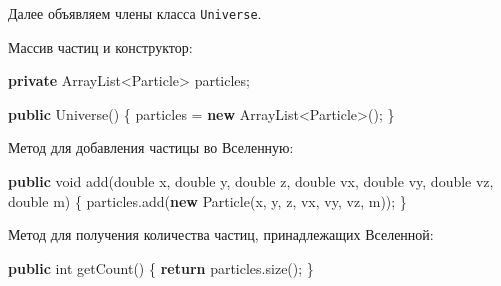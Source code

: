 \documentclass[
  12pt,
  a4paper,
]{article}
\newenvironment{Shaded}{}{}
\newcommand{\BuiltInTok}[1]{#1}
\newcommand{\ControlFlowTok}[1]{\textcolor[rgb]{0.00,0.44,0.13}{\textbf{#1}}}
\newcommand{\DataTypeTok}[1]{\textcolor[rgb]{0.56,0.13,0.00}{#1}}
\newcommand{\FunctionTok}[1]{\textcolor[rgb]{0.02,0.16,0.49}{#1}}
\newcommand{\KeywordTok}[1]{\textcolor[rgb]{0.00,0.44,0.13}{\textbf{#1}}}
\newcommand{\NormalTok}[1]{#1}
\newcommand{\OperatorTok}[1]{\textcolor[rgb]{0.40,0.40,0.40}{#1}}
\begin{document}
Далее объявляем члены класса \texttt{Universe}.

Массив частиц и конструктор:

\begin{Shaded}
\begin{Highlighting}[]
\KeywordTok{private} \BuiltInTok{ArrayList}\OperatorTok{\textless{}}\NormalTok{Particle}\OperatorTok{\textgreater{}}\NormalTok{ particles}\OperatorTok{;}

\KeywordTok{public} \FunctionTok{Universe}\OperatorTok{()} \OperatorTok{\{}
\NormalTok{    particles }\OperatorTok{=} \KeywordTok{new} \BuiltInTok{ArrayList}\OperatorTok{\textless{}}\NormalTok{Particle}\OperatorTok{\textgreater{}();}
\OperatorTok{\}}
\end{Highlighting}
\end{Shaded}

Метод для добавления частицы во Вселенную:

\begin{Shaded}
\begin{Highlighting}[]
\KeywordTok{public} \DataTypeTok{void} \FunctionTok{add}\OperatorTok{(}\DataTypeTok{double}\NormalTok{ x}\OperatorTok{,} \DataTypeTok{double}\NormalTok{ y}\OperatorTok{,} \DataTypeTok{double}\NormalTok{ z}\OperatorTok{,} \DataTypeTok{double}\NormalTok{ vx}\OperatorTok{,} \DataTypeTok{double}\NormalTok{ vy}\OperatorTok{,} \DataTypeTok{double}\NormalTok{ vz}\OperatorTok{,} \DataTypeTok{double}\NormalTok{ m}\OperatorTok{)} \OperatorTok{\{}
\NormalTok{    particles}\OperatorTok{.}\FunctionTok{add}\OperatorTok{(}\KeywordTok{new} \FunctionTok{Particle}\OperatorTok{(}\NormalTok{x}\OperatorTok{,}\NormalTok{ y}\OperatorTok{,}\NormalTok{ z}\OperatorTok{,}\NormalTok{ vx}\OperatorTok{,}\NormalTok{ vy}\OperatorTok{,}\NormalTok{ vz}\OperatorTok{,}\NormalTok{ m}\OperatorTok{));}
\OperatorTok{\}}
\end{Highlighting}
\end{Shaded}

Метод для получения количества частиц, принадлежащих Вселенной:

\begin{Shaded}
\begin{Highlighting}[]
\KeywordTok{public} \DataTypeTok{int} \FunctionTok{getCount}\OperatorTok{()} \OperatorTok{\{}
    \ControlFlowTok{return}\NormalTok{ particles}\OperatorTok{.}\FunctionTok{size}\OperatorTok{();}
\OperatorTok{\}}
\end{Highlighting}
\end{Shaded}
\end{document}
